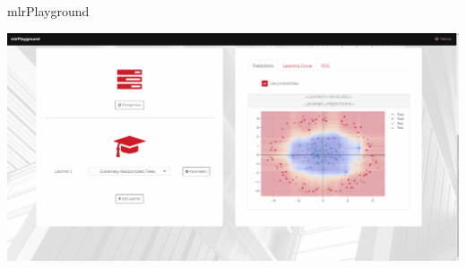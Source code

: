\begin{vbframe}{mlrPlayground}
\begin{center}

\includegraphics[width=\linewidth]{figure_man/mlrplayground_welcome.png}

\href{https://compstat-lmu.shinyapps.io/mlrPlayground/}{}

\end{center}
\end{vbframe}


